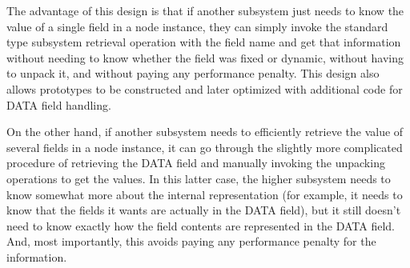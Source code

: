The advantage of this design is that if another subsystem just needs
to know the value of a single field in a node instance, they can
simply invoke the standard type subsystem retrieval operation with
the field name and get that information without needing to know
whether the field was fixed or dynamic, without having to unpack it,
and without paying any performance penalty.  This design also allows 
prototypes to be constructed and later optimized with additional code
for DATA field handling.

On the other hand, if another subsystem needs to efficiently retrieve
the value of several fields in a node instance, it can go through the
slightly more complicated procedure of retrieving the DATA field and
manually invoking the unpacking operations to get the values.  In this
latter case, the higher subsystem needs to know somewhat more about
the internal representation (for example, it needs to know that the
fields it wants are actually in the DATA field), but it still doesn't
need to know exactly how the field contents are represented in the
DATA field.  And, most importantly, this avoids paying any performance
penalty for the information.
